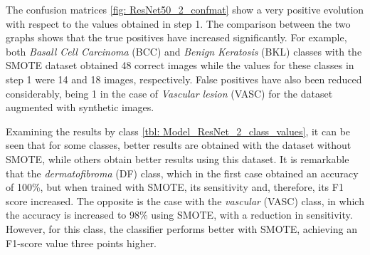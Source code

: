The confusion matrices \ref{fig: ResNet50_2_confmat} show a very positive evolution with respect to the values obtained in step 1. The comparison between the two graphs shows that the true positives have increased significantly. For example, both \textit{Basall Cell Carcinoma} (BCC) and \textit{Benign Keratosis} (BKL) classes with the SMOTE dataset obtained 48 correct images while the values for these classes in step 1 were 14 and 18 images, respectively. False positives have also been reduced considerably, being 1 in the case of \textit{Vascular lesion} (VASC) for the dataset augmented with synthetic images.

\begin{table}[ht]
\centering
{}
    \caption{ResNet50 Step 2. Metrics obtained by class.}
    \label{tbl: Model_ResNet_2_class_values}
\end{table}

Examining the results by class \ref{tbl: Model_ResNet_2_class_values}, it can be seen that for some classes, better results are obtained with the dataset without SMOTE, while others obtain better results using this dataset. It is remarkable that the \textit{dermatofibroma} (DF) class, which in the first case obtained an accuracy of 100\%, but when trained with SMOTE, its sensitivity and, therefore, its F1 score increased. The opposite is the case with the \textit{vascular} (VASC) class, in which the accuracy is increased to 98\% using SMOTE, with a reduction in sensitivity. However, for this class, the classifier performs better with SMOTE, achieving an F1-score value three points higher.

